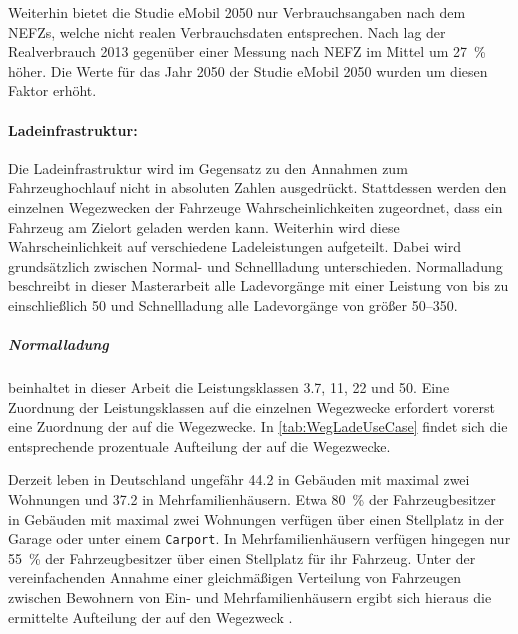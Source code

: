 Weiterhin bietet die Studie \glqq eMobil \num{2050}\grqq{} nur Verbrauchsangaben nach dem \glspl{NEFZ}, welche nicht realen Verbrauchsdaten entsprechen.
Nach \cite{Heinfellner2015} lag der Realverbrauch \num{2013} gegenüber einer Messung nach \gls{NEFZ} im Mittel um \SI{27}{\percent} höher.
Die Werte für das Jahr \num{2050} der Studie \glqq eMobil \num{2050}\grqq{} wurden um diesen Faktor erhöht.



\paragraph{Ladeinfrastruktur:}

Die Ladeinfrastruktur wird im Gegensatz zu den Annahmen zum Fahrzeughochlauf nicht in absoluten Zahlen ausgedrückt.
Stattdessen werden den einzelnen Wegezwecken der Fahrzeuge Wahrscheinlichkeiten zugeordnet, dass ein Fahrzeug am Zielort geladen werden kann.
Weiterhin wird diese Wahrscheinlichkeit auf verschiedene Ladeleistungen aufgeteilt.
Dabei wird grundsätzlich zwischen Normal- und Schnellladung unterschieden.
Normalladung beschreibt in dieser Masterarbeit alle Ladevorgänge mit einer Leistung von bis zu einschließlich \SI{50}{\kw} und Schnellladung alle Ladevorgänge von größer \SIrange[range-phrase=~bis~einschließlich~]{50}{350}{\kw}.

\subparagraph{Normalladung} beinhaltet in dieser Arbeit die Leistungsklassen \SI{3.7}{\kw}, \SI{11}{\kw}, \SI{22}{\kw} und \SI{50}{\kw}.
Eine Zuordnung der Leistungsklassen auf die einzelnen Wegezwecke erfordert vorerst eine Zuordnung der \UCs auf die Wegezwecke.
In \autoref{tab:WegLadeUseCase} findet sich die entsprechende prozentuale Aufteilung der \UCs auf die Wegezwecke.



Derzeit leben in Deutschland ungefähr \SI{44.2}{\MioMen} in Gebäuden mit maximal zwei Wohnungen und \SI{37.2}{\MioMen} in Mehrfamilienhäusern.
Etwa \SI{80}{\percent} der Fahrzeugbesitzer in Gebäuden mit maximal zwei Wohnungen verfügen über einen Stellplatz in der Garage oder unter einem \texttt{Carport}.
In Mehrfamilienhäusern verfügen hingegen nur \SI{55}{\percent} der Fahrzeugbesitzer über einen Stellplatz für ihr Fahrzeug. \cite{dena2020}
Unter der vereinfachenden Annahme einer gleichmäßigen Verteilung von Fahrzeugen zwischen Bewohnern von Ein- und Mehrfamilienhäusern ergibt sich hieraus die ermittelte Aufteilung der \UCs auf den Wegezweck \nHdot.\medskip


